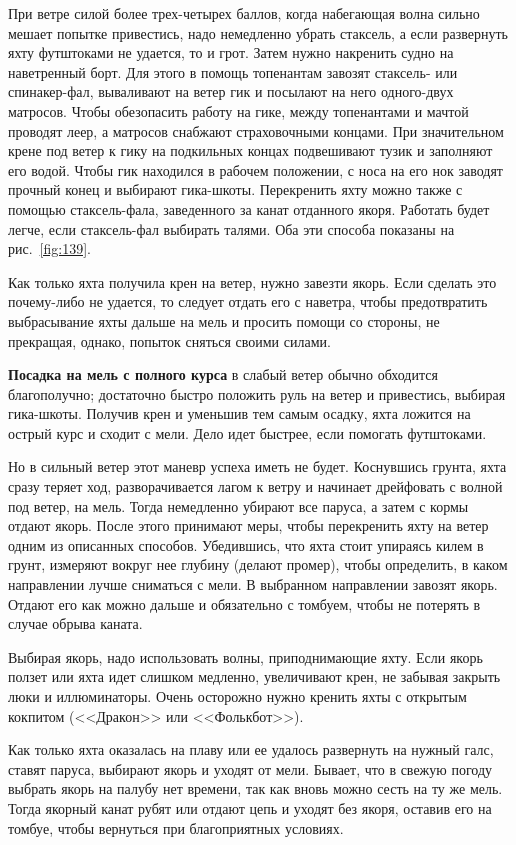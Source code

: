 \documentclass[a4paper, 12pt, twoside, final]{scrbook}
\begin{document}
При ветре силой более трех-четырех баллов, когда набегающая волна сильно мешает попытке привестись, надо немедленно убрать стаксель, а если развернуть яхту футштоками не удается, то и грот. Затем нужно накренить судно на наветренный борт. Для этого в помощь топенантам завозят стаксель- или спинакер-фал, вываливают на ветер гик и посылают на него одного-двух матросов. Чтобы обезопасить работу на гике, между топенантами и мачтой проводят леер, а матросов снабжают страховочными концами. При значительном крене под ветер к гику на подкильных концах подвешивают тузик и заполняют его водой. Чтобы гик находился в рабочем положении, с носа на его нок заводят прочный конец и выбирают гика-шкоты. Перекренить яхту можно также с помощью стаксель-фала, заведенного за канат отданного якоря. Работать будет легче, если стаксель-фал выбирать талями. Оба эти способа показаны на рис.~\ref{fig:139}.

Как только яхта получила крен на ветер, нужно завезти якорь. Если сделать это почему-либо не удается, то следует отдать его с наветра, чтобы предотвратить выбрасывание яхты дальше на мель и просить помощи со стороны, не прекращая, однако, попыток сняться своими силами.

\textbf{Посадка на мель с полного курса} в слабый ветер обычно обходится благополучно; достаточно быстро положить руль на ветер и привестись, выбирая гика-шкоты. Получив крен и уменьшив тем самым осадку, яхта ложится на острый курс и сходит с мели. Дело идет быстрее, если помогать футштоками.

Но в сильный ветер этот маневр успеха иметь не будет. Коснувшись грунта, яхта сразу теряет ход, разворачивается лагом к ветру и начинает дрейфовать с волной под ветер, на мель. Тогда немедленно убирают все паруса, а затем с кормы отдают якорь. После этого принимают меры, чтобы перекренить яхту на ветер одним из описанных способов. Убедившись, что яхта стоит упираясь килем в грунт, измеряют вокруг нее глубину (делают промер), чтобы определить, в каком направлении лучше сниматься с мели. В выбранном направлении завозят якорь. Отдают его как можно дальше и обязательно с томбуем, чтобы не потерять в случае обрыва каната.

Выбирая якорь, надо использовать волны, приподнимающие яхту. Если якорь ползет или яхта идет слишком медленно, увеличивают крен, не забывая закрыть люки и иллюминаторы. Очень осторожно нужно кренить яхты с открытым кокпитом (<<Дракон>> или <<Фолькбот>>).

Как только яхта оказалась на плаву или ее удалось развернуть на нужный галс, ставят паруса, выбирают якорь и уходят от мели. Бывает, что в свежую погоду выбрать якорь на палубу нет времени, так как вновь можно сесть на ту же мель. Тогда якорный канат рубят или отдают цепь и уходят без якоря, оставив его на томбуе, чтобы вернуться при благоприятных условиях.
\end{document}
